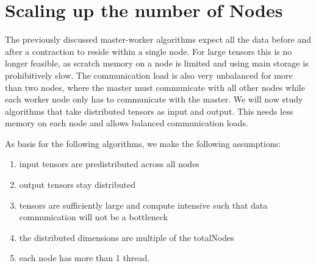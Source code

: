 \section{Scaling up the number of Nodes}


The previously discussed master-worker algorithms expect all the data before and after a contraction to reside within a single node. %
For large tensors this is no longer feasible, as scratch memory on a node is limited and using main storage is prohibitively slow.
The communication load is also very unbalanced for more than two nodes, where the master must communicate with all other nodes while each worker node only has to communicate with the master.
We will now study algorithms that take distributed tensors as input and output.
This needs less memory on each node and allows balanced communication loads.

As basis for the following algorithms, we make the following assumptions:
\begin{enumerate}
    \item input tensors are predistributed across all nodes 
    \item output tensors stay distributed
    \item tensors are sufficiently large and compute intensive such that data communication will not be a bottleneck
    \item the distributed dimensions are multiple of the totalNodes
    \item each node has more than 1 thread.
\end{enumerate}


